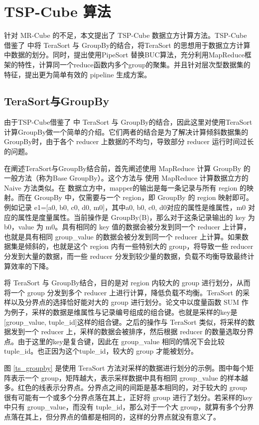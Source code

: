 \chapter{TSP-Cube 算法}

针对 MR-Cube 的不足，本文提出了 TSP-Cube 数据立方计算方法。TSP-Cube 借鉴了 \cite{tao2013minimal} 中将 TeraSort 与 GroupBy的结合，将TeraSort 的思想用于数据立方计算中数据的划分。同时，提出使用PipeSort 替换BUC算法，充分利用MapReduce框架的特性，计算同一个reduce函数内多个group的聚集。并且针对层次型数据集的特征，提出更为简单有效的 pipeline 生成方案。


\section{TeraSort与GroupBy}

由于TSP-Cube借鉴了 \cite{tao2013minimal} 中 TeraSort 与 GroupBy的结合，因此这里对使用TeraSort计算GroupBy做一个简单的介绍。它们两者的结合是为了解决计算倾斜数据集的GroupBy时，由于各个 reducer 上数据的不均匀，导致部分 reducer 运行时间过长的问题。

在阐述TeraSort与GroupBy结合前，首先阐述使用 MapReduce 计算 GroupBy 的一般方法（称为Base GroupBy）。这个方法与 使用 MapReduce 计算数据立方的 Naive 方法类似。在 数据立方中，mapper的输出是每一条记录与所有 region 的映射。而在 GroupBy 中，仅需要与一个 region，即 GroupBy 的 region 映射即可。例如记录 e1=[a0, b0, c0, d0, m0]，其中a0, b0, c0, d0对应的属性是维属性，m0 对应的属性是度量属性。当前操作是 GroupBy(B)，那么对于这条记录输出的 key 为 b0，value 为 m0。具有相同的 key 值的数据会被分发到同一个 reducer 上计算，也就是具有相同 group\_value 的数据会被分发到同一个 reducer 上计算。如果数据集是倾斜的，也就是这个 region 内有一些特别大的 group，将导致一些 reducer 分发到大量的数据，而一些 reducer 分发到较少量的数据，负载不均衡导致最终计算效率的下降。

将 TeraSort 与 GroupBy结合，目的是对 region 内较大的 group 进行划分，从而将一个 group 分发到多个 reducer 上进行计算，降低负载不均衡。TeraSort 的采样以及分界点的选择恰好能对大的 group 进行划分。论文中以度量函数 SUM 作为例子，采样的数据是维属性与记录编号组成的组合键。也就是采样的key是[group\_value, tuple\_id]这样的组合键。之后的操作与 TeraSort 类似，将采样的数据发到一个 reducer 上，采样的数据会被排序，然后根据 reducer 的数量选取分界点。由于这里的key是复合键，因此在 group\_value 相同的情况下会比较 tuple\_id。也正因为这个tuple\_id，较大的 group 才能被划分。

图 \ref{ts_groupby} 是使用 TeraSort 方法对采样的数据进行划分的示例。图中每个矩阵表示一个 group，矩阵越大，表示采样数据中具有相同 group\_value 的样本越多。红色的线表示分界点。分界点之间的间距是基本相同的，对于较大的 group 很有可能有一个或多个分界点落在其上，正好将 group 进行了划分。若采样的key中只有 group\_value，而没有 tuple\_id，那么对于一个大 group，就算有多个分界点落在其上，但分界点的值都是相同的，这样的分界点就没有意义了。


